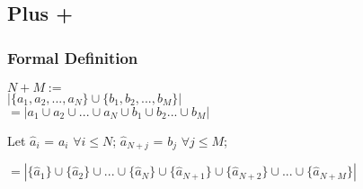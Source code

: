 \documentclass[11pt]{article}
\begin{document}
\subsection{Plus +}
\subsubsection{Formal Definition}
\begin{center}
\vspace{1mm}
$
N + M :=
$
\\ \vspace{2mm}
$
| \{a_1,a_2,...,a_N\} \cup \{b_1,b_2,...,b_M\} |
$
\\ \vspace{2mm}
$
= | a_1 \cup a_2 \cup ... \cup a_N \cup b_1 \cup b_2 ... \cup b_M |
$
\end{center}
Let $\hat{a}_{i}$ = $a_i$ \hspace{2mm} $\forall i \leq N$; \hspace{2mm} $\hat{a}_{N+j}$ = $b_j$ \hspace{2mm} $\forall j \leq M$; 
\begin{center}
$
= |\{\hat{a}_1\} \cup \{\hat{a}_2\} \cup ... \cup \{\hat{a}_N\} \cup \{\hat{a}_{N+1}\} \cup \{\hat{a}_{N+2}\} \cup ... \cup \{\hat{a}_{N+M}\}|
$
\end{center}
\end{document}
